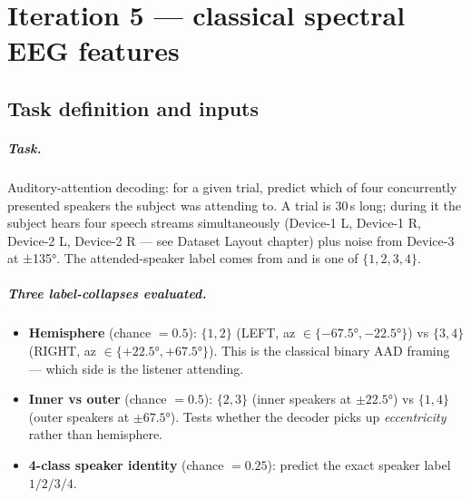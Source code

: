\chapter{Iteration 5 --- classical spectral EEG features}
\label{ch:iter5}

\section{Task definition and inputs}

\paragraph{Task.} Auditory-attention decoding: for a given trial, predict
which of four concurrently presented speakers the subject was attending
to. A trial is 30\,s long; during it the subject hears four speech
streams simultaneously (Device-1 L, Device-1 R, Device-2 L, Device-2 R
--- see Dataset Layout chapter) plus noise from Device-3 at ±135°. The
attended-speaker label comes from  and is one of
$\{1, 2, 3, 4\}$.

\paragraph{Three label-collapses evaluated.}
\begin{itemize}
  \item \textbf{Hemisphere} (chance $= 0.5$): $\{1,2\}$ (LEFT,
        az $\in\{-67.5°, -22.5°\}$) vs $\{3,4\}$ (RIGHT, az $\in\{+22.5°,
        +67.5°\}$). This is the classical binary AAD framing --- which
        side is the listener attending.
  \item \textbf{Inner vs outer} (chance $= 0.5$): $\{2,3\}$ (inner
        speakers at $\pm 22.5°$) vs $\{1,4\}$ (outer speakers at
        $\pm 67.5°$). Tests whether the decoder picks up \emph{eccentricity}
        rather than hemisphere.
  \item \textbf{4-class speaker identity} (chance $= 0.25$): predict the
        exact speaker label $1/2/3/4$.
\end{itemize}

